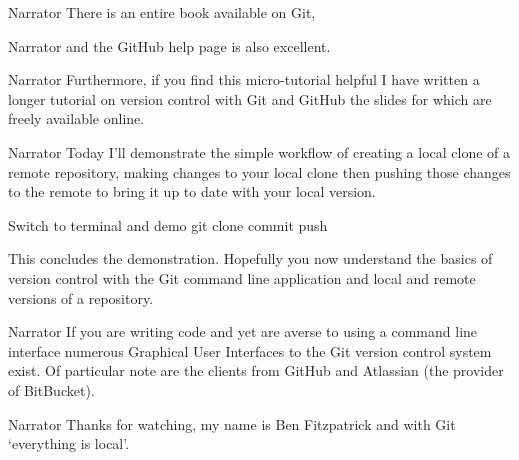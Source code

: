 \documentclass{screenplay} %
\begin{document}
\begin{dialogue}{Narrator} 
There is an entire book available on Git,
\end{dialogue}

\begin{dialogue}{Narrator} 
and the GitHub help page is also excellent.
\end{dialogue}

\begin{dialogue}{Narrator} 
Furthermore, if you find this micro-tutorial helpful I have written a longer tutorial on version control with Git and GitHub the slides for which are freely available online.
\end{dialogue}

\begin{dialogue}{Narrator} 
Today I'll demonstrate the simple workflow of creating a local clone of a remote repository, making changes to your local clone then pushing those changes to the remote to bring it up to date with your local version.
\end{dialogue}

Switch to terminal and demo git clone commit push

\begin{dialogue} This concludes the demonstration.
\newline
\newline
Hopefully you now understand the basics of version control with the Git command line application and local and remote versions of a repository. %
\end{dialogue}

\begin{dialogue}{Narrator}
If you are writing code and yet are averse to using a command line interface numerous Graphical User Interfaces to the Git version control system exist.
\newline
\newline
Of particular note are the clients from GitHub and Atlassian (the provider of BitBucket).
\end{dialogue}

\begin{dialogue}{Narrator}
Thanks for watching, my name is Ben Fitzpatrick and with Git `everything is local'.
\end{dialogue}
\end{document}
